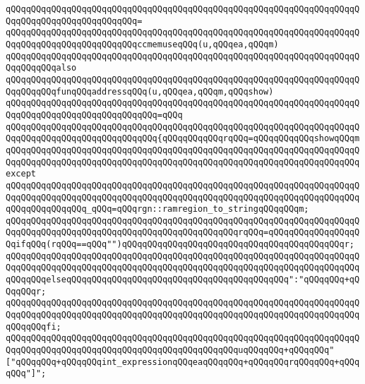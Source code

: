 \verb|qQQqqQQqqQQqqQQqqQQqqQQqqQQqqQQqqQQqqQQqqQQqqQQqqQQqqQQqqQQqqQQqqQQqqQQqqQQqqQQqqQQqqQQqqQQqqQQq=|\newline
\verb|qQQqqQQqqQQqqQQqqQQqqQQqqQQqqQQqqQQqqQQqqQQqqQQqqQQqqQQqqQQqqQQqqQQqqQQqqQQqqQQqqQQqqQQqqQQqqQQqccmemuseqQQq(u,qQQqea,qQQqm)|\newline
\newline
\verb|qQQqqQQqqQQqqQQqqQQqqQQqqQQqqQQqqQQqqQQqqQQqqQQqqQQqqQQqqQQqqQQqqQQqqQQqqQQqqQQqalso|\newline
\verb|qQQqqQQqqQQqqQQqqQQqqQQqqQQqqQQqqQQqqQQqqQQqqQQqqQQqqQQqqQQqqQQqqQQqqQQqqQQqqQQqfunqQQqaddressqQQq(u,qQQqea,qQQqm,qQQqshow)|\newline
\verb|qQQqqQQqqQQqqQQqqQQqqQQqqQQqqQQqqQQqqQQqqQQqqQQqqQQqqQQqqQQqqQQqqQQqqQQqqQQqqQQqqQQqqQQqqQQqqQQqqQQq=qQQq|\newline
\verb|qQQqqQQqqQQqqQQqqQQqqQQqqQQqqQQqqQQqqQQqqQQqqQQqqQQqqQQqqQQqqQQqqQQqqQQqqQQqqQQqqQQqqQQqqQQqqQQqqQQq{qQQqqQQqqQQqrqQQq=qQQqqQQqqQQqshowqQQqm|\newline
\verb|qQQqqQQqqQQqqQQqqQQqqQQqqQQqqQQqqQQqqQQqqQQqqQQqqQQqqQQqqQQqqQQqqQQqqQQqqQQqqQQqqQQqqQQqqQQqqQQqqQQqqQQqqQQqqQQqqQQqqQQqqQQqqQQqqQQqqQQqqQQqexcept|\newline
\verb|qQQqqQQqqQQqqQQqqQQqqQQqqQQqqQQqqQQqqQQqqQQqqQQqqQQqqQQqqQQqqQQqqQQqqQQqqQQqqQQqqQQqqQQqqQQqqQQqqQQqqQQqqQQqqQQqqQQqqQQqqQQqqQQqqQQqqQQqqQQqqQQqqQQqqQQqqQQq_qQQq=qQQqrgn::ramregion_to_stringqQQqqQQqm;|\newline
\newline
\verb|qQQqqQQqqQQqqQQqqQQqqQQqqQQqqQQqqQQqqQQqqQQqqQQqqQQqqQQqqQQqqQQqqQQqqQQqqQQqqQQqqQQqqQQqqQQqqQQqqQQqqQQqqQQqqQQqqQQqrqQQq=qQQqqQQqqQQqqQQqqQQqifqQQq(rqQQq==qQQq"")qQQqqQQqqQQqqQQqqQQqqQQqqQQqqQQqqQQqqQQqqQQqr;|\newline
\verb|qQQqqQQqqQQqqQQqqQQqqQQqqQQqqQQqqQQqqQQqqQQqqQQqqQQqqQQqqQQqqQQqqQQqqQQqqQQqqQQqqQQqqQQqqQQqqQQqqQQqqQQqqQQqqQQqqQQqqQQqqQQqqQQqqQQqqQQqqQQqqQQqqQQqelseqQQqqQQqqQQqqQQqqQQqqQQqqQQqqQQqqQQqqQQqqQQq":"qQQqqQQq+qQQqqQQqr;|\newline
\verb|qQQqqQQqqQQqqQQqqQQqqQQqqQQqqQQqqQQqqQQqqQQqqQQqqQQqqQQqqQQqqQQqqQQqqQQqqQQqqQQqqQQqqQQqqQQqqQQqqQQqqQQqqQQqqQQqqQQqqQQqqQQqqQQqqQQqqQQqqQQqqQQqqQQqfi;|\newline
\newline
\verb|qQQqqQQqqQQqqQQqqQQqqQQqqQQqqQQqqQQqqQQqqQQqqQQqqQQqqQQqqQQqqQQqqQQqqQQqqQQqqQQqqQQqqQQqqQQqqQQqqQQqqQQqqQQqqQQqqQQquqQQqqQQq+qQQqqQQq"["qQQqqQQq+qQQqqQQqint_expressionqQQqeaqQQqqQQq+qQQqqQQqrqQQqqQQq+qQQqqQQq"]";|\newline
